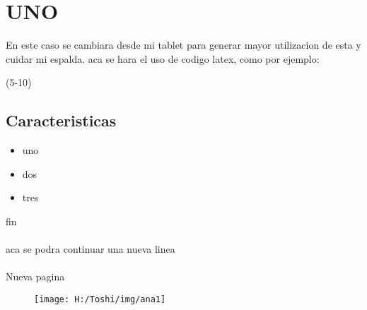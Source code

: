 \section{UNO}
   En este caso se cambiara desde mi tablet para generar mayor utilizacion de esta y cuidar mi espalda.
			aca se hara el uso de codigo latex, como por ejemplo:

\lipsum(5-10)

\subsection{Caracteristicas}
\begin{itemize}
\item uno
\item dos
\item tres
\end{itemize}
fin\\
\\
aca se podra continuar una nueva linea\\
\\
\newpage
Nueva pagina
\begin{figure}
   \centering
   \texttt{[image: H:/Toshi/img/ana1]}
\end{figure}

